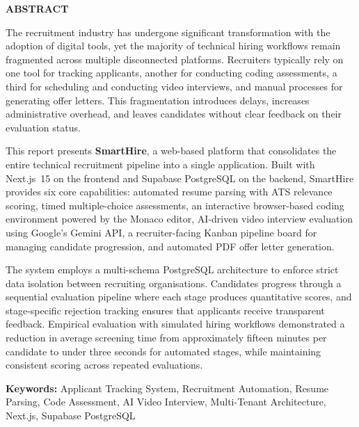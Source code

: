 \cleardoublepage
\thispagestyle{plain}
\begin{center}
    {\Large \bfseries ABSTRACT}\\[0.25in]
\end{center}

The recruitment industry has undergone significant transformation with the adoption of digital tools, yet the majority of technical hiring workflows remain fragmented across multiple disconnected platforms. Recruiters typically rely on one tool for tracking applicants, another for conducting coding assessments, a third for scheduling and conducting video interviews, and manual processes for generating offer letters. This fragmentation introduces delays, increases administrative overhead, and leaves candidates without clear feedback on their evaluation status.

This report presents \textbf{SmartHire}, a web-based platform that consolidates the entire technical recruitment pipeline into a single application. Built with Next.js~15 on the frontend and Supabase PostgreSQL on the backend, SmartHire provides six core capabilities: automated resume parsing with ATS relevance scoring, timed multiple-choice assessments, an interactive browser-based coding environment powered by the Monaco editor, AI-driven video interview evaluation using Google's Gemini API, a recruiter-facing Kanban pipeline board for managing candidate progression, and automated PDF offer letter generation.

The system employs a multi-schema PostgreSQL architecture to enforce strict data isolation between recruiting organisations. Candidates progress through a sequential evaluation pipeline where each stage produces quantitative scores, and stage-specific rejection tracking ensures that applicants receive transparent feedback. Empirical evaluation with simulated hiring workflows demonstrated a reduction in average screening time from approximately fifteen minutes per candidate to under three seconds for automated stages, while maintaining consistent scoring across repeated evaluations.

\vspace{0.3in}
\textbf{Keywords:} Applicant Tracking System, Recruitment Automation, Resume Parsing, Code Assessment, AI Video Interview, Multi-Tenant Architecture, Next.js, Supabase PostgreSQL

\cleardoublepage
